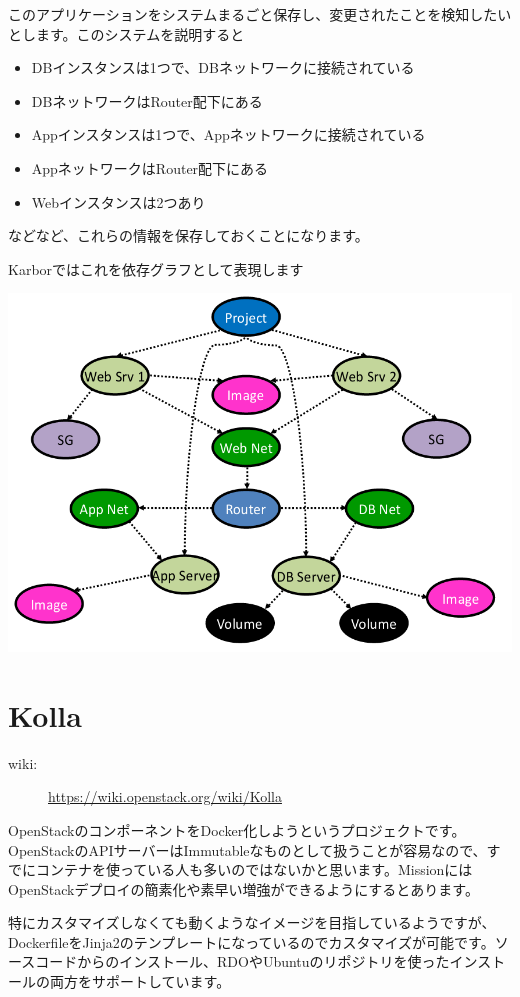 このアプリケーションをシステムまるごと保存し、変更されたことを検知したいとします。このシステムを説明すると
\begin{itemize}
	\item DBインスタンスは1つで、DBネットワークに接続されている
	\item DBネットワークはRouter配下にある
	\item Appインスタンスは1つで、Appネットワークに接続されている
	\item AppネットワークはRouter配下にある
	\item Webインスタンスは2つあり
\end{itemize}
などなど、これらの情報を保存しておくことになります。

Karborではこれを依存グラフとして表現します

\includegraphics[width=\textwidth]{img/Smaug-dependency-graph.png}

\section{Kolla}
\begin{description}
	\item[wiki:] \url{https://wiki.openstack.org/wiki/Kolla}
\end{description}
OpenStackのコンポーネントをDocker化しようというプロジェクトです。OpenStackのAPIサーバーはImmutableなものとして扱うことが容易なので、すでにコンテナを使っている人も多いのではないかと思います。MissionにはOpenStackデプロイの簡素化や素早い増強ができるようにするとあります。

特にカスタマイズしなくても動くようなイメージを目指しているようですが、DockerfileをJinja2のテンプレートになっているのでカスタマイズが可能です。ソースコードからのインストール、RDOやUbuntuのリポジトリを使ったインストールの両方をサポートしています。

